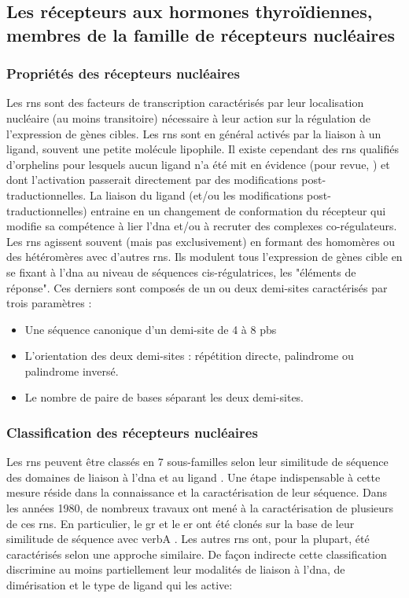 \documentclass[../main.tex]{subfiles}
\begin{document}

\subsection{Les récepteurs aux hormones thyroïdiennes, membres de la famille de récepteurs nucléaires}\label{subsubsec:TR}

\subsubsection{Propriétés des récepteurs nucléaires}
Les \glspl{rn} sont des facteurs de transcription caractérisés par leur localisation nucléaire (au moins transitoire) nécessaire à leur action sur la régulation de l'expression de gènes cibles.
Les \glspl{rn} sont en général activés par la liaison à un ligand, souvent une petite molécule lipophile.
Il existe cependant des \glspl{rn} qualifiés d'orphelins pour lesquels aucun ligand n'a été mit en évidence (pour revue, \citealp{Giguere1999}) et dont l'activation passerait directement par des modifications post-traductionnelles.
La liaison du ligand (et/ou les modifications post-traductionnelles) entraine en un changement de conformation du récepteur qui modifie sa compétence à lier l'\gls{dna} et/ou à recruter des complexes co-régulateurs.
Les \glspl{rn} agissent souvent (mais pas exclusivement) en formant des homomères ou des hétéromères avec d'autres \glspl{rn}.
Ils modulent tous l'expression de gènes cible en se fixant à l'\gls{dna} au niveau de séquences cis-régulatrices, les "éléments de réponse".
Ces derniers sont composés de un ou deux demi-sites caractérisés par trois paramètres :
\begin{itemize}
\item Une séquence canonique d'un demi-site de 4 à 8 \glspl{pb}
\item L'orientation des deux demi-sites : répétition directe, palindrome ou palindrome inversé.	
\item Le nombre de paire de bases séparant les deux demi-sites.
\end{itemize}

\subsubsection{Classification des récepteurs nucléaires}
Les \glspl{rn} peuvent être classés en 7 sous-familles selon leur similitude de séquence des domaines de liaison à l'\gls{dna} et au ligand \citep{Laudet1997,Committee1999}.
Une étape indispensable à cette mesure réside dans la connaissance et la caractérisation de leur séquence.
Dans les années 1980, de nombreux travaux ont mené à la caractérisation de plusieurs de ces \glspl{rn}.
En particulier, le \gls{gr} et le \gls{er} ont été clonés sur la base de leur similitude de séquence avec \gls{verbA} \citep{Hollenberg1985, Green1986}.
Les autres \glspl{rn} ont, pour la plupart, été caractérisés selon une approche similaire.
De façon indirecte cette classification discrimine au moins partiellement leur modalités de liaison à l'\gls{dna}, de dimérisation et le type de ligand qui les active:
\end{document}
